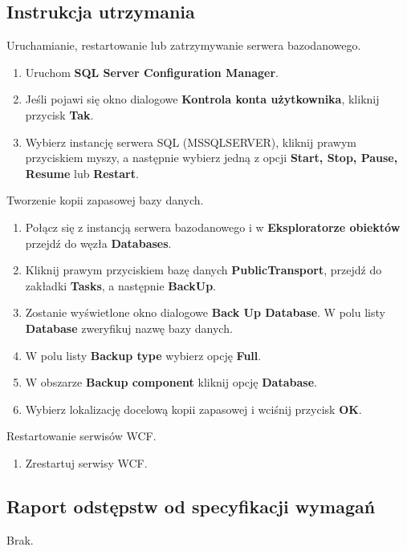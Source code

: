 \documentclass[10pt,a4paper]{article}
\begin{document}
\subsection{Instrukcja utrzymania}
Uruchamianie, restartowanie lub zatrzymywanie serwera bazodanowego.
\begin{enumerate}
	\item Uruchom \textbf{SQL Server Configuration Manager}.
	\item Jeśli pojawi się okno dialogowe \textbf{Kontrola konta użytkownika}, kliknij przycisk \textbf{Tak}.
	\item Wybierz instancję serwera SQL (MSSQLSERVER), kliknij prawym przyciskiem myszy, a następnie wybierz jedną z opcji \textbf{Start, Stop, Pause, Resume} lub \textbf{Restart}.
\end{enumerate}
Tworzenie kopii zapasowej bazy danych.
\begin{enumerate}
	\item Połącz się z instancją serwera bazodanowego i w \textbf{Eksploratorze obiektów} przejdź do węzła \textbf{Databases}.
	\item Kliknij prawym przyciskiem bazę danych \textbf{PublicTransport}, przejdź do zakładki \textbf{Tasks}, a następnie \textbf{BackUp}.
	\item Zostanie wyświetlone okno dialogowe \textbf{Back Up Database}. W polu listy \textbf{Database} zweryfikuj nazwę bazy danych.
	\item W polu listy \textbf{Backup type} wybierz opcję \textbf{Full}.
	\item W obszarze \textbf{Backup component} kliknij opcję \textbf{Database}.
	\item Wybierz lokalizację docelową kopii zapasowej i wciśnij przycisk \textbf{OK}.
\end{enumerate}
Restartowanie serwisów WCF.
\begin{enumerate} %
	\item Zrestartuj serwisy WCF.
\end{enumerate}

\subsection{Raport odstępstw od specyfikacji wymagań}
Brak.

\end{document}
